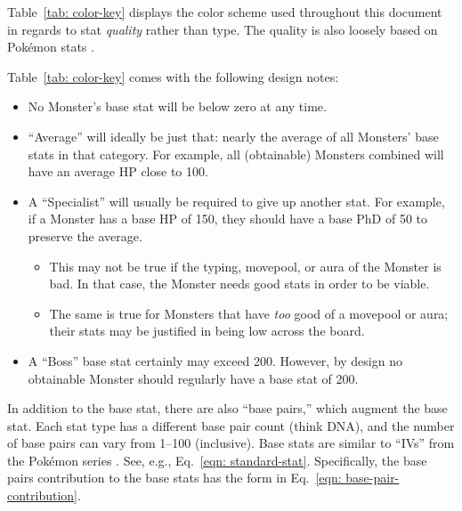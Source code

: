 Table~\ref{tab: color-key} displays the color scheme used throughout this document in regards to stat \textit{quality} rather than type. The quality is also loosely based on Pok\'{e}mon stats \cite{pkmn-stats}.


\noindent Table~\ref{tab: color-key} comes with the following design notes:
\begin{itemize}
	\item{No Monster's base stat will be below zero at any time.}
	\item{``Average'' will ideally be just that: nearly the average of all Monsters' base stats in that category. For example, all (obtainable) Monsters combined will have an average HP close to 100.}
	\item{A ``Specialist'' will usually be required to give up another stat. For example, if a Monster has a base HP of 150, they should have a base PhD of 50 to preserve the average.
		\begin{itemize}
			\item{This may not be true if the typing, movepool, or aura of the Monster is bad. In that case, the Monster needs good stats in order to be viable.}
			\item{The same is true for Monsters that have \textit{too} good of a movepool or aura; their stats may be justified in being low across the board.}
		\end{itemize}
	}
	\item{A ``Boss'' base stat certainly may exceed 200. However, by design no obtainable Monster should regularly have a base stat of 200.}
\end{itemize}





\newpage
{}


In addition to the base stat, there are also ``base pairs,'' which augment the base stat. Each stat type has a different base pair count (think DNA), and the number of base pairs can vary from 1--100 (inclusive). Base stats are similar to ``IVs'' from the Pok\'{e}mon series \cite{pkmn-stats}. See, e.g., Eq.~\eqref{eqn: standard-stat}. Specifically, the base pairs contribution to the base stats has the form in Eq.~\eqref{eqn: base-pair-contribution}.

